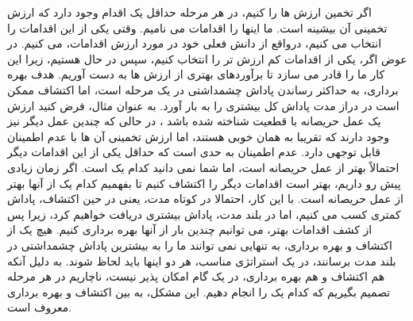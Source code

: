 اگر تخمین ارزش ها را کنیم، در هر مرحله حداقل یک اقدام وجود دارد
که ارزش تخمینی آن بیشینه است. ما اینها را اقدامات  می نامیم. وقتی یکی از این اقدامات را انتخاب می کنیم،
درواقع از دانش فعلی خود در مورد ارزش اقدامات،  می کنیم. در عوض اگر،
یکی از اقدامات کم ارزش تر را انتخاب کنیم، سپس در حال  هستیم، زیرا این کار ما را قادر می سازد تا برآوردهای بهتری از ارزش ها به دست آوریم. هدف بهره برداری، به حداکثر رساندن پاداش چشمداشتی در یک مرحله است، اما اکتشاف ممکن است در دراز مدت پاداش کل بیشتری را به بار آورد.
به عنوان مثال، فرض کنید ارزش یک عمل حریصانه با قطعیت شناخته شده باشد ، در حالی که چندین عمل دیگر نیز وجود دارند که
تقریبا به همان خوبی  هستند، اما ارزش تخمینی آن ها با عدم اطمینان قابل توجهی دارد. عدم اطمینان به حدی است که حداقل
یکی از این اقدامات دیگر احتمالاً بهتر از عمل حریصانه است، اما شما نمی دانید کدام یک است.
اگر زمان زیادی پیش رو داریم، بهتر است
اقدامات دیگر را اکتشاف کنیم تا بفهمیم کدام یک از آنها بهتر از عمل حریصانه است. با این کار، احتمالا در کوتاه مدت، یعنی در حین اکتشاف، پاداش کمتری کسب می کنیم، اما در بلند مدت، پاداش بیشتری دریافت خواهیم کرد، زیرا پس از کشف اقدامات بهتر، می توانیم چندین بار از آنها بهره برداری کنیم. 
هیچ یک از اکتشاف و بهره برداری، به تنهایی نمی توانند ما را به بیشترین پاداش چشمداشتی در بلند مدت برسانند، در یک استراتژی مناسب، هر دو اینها باید لحاظ شوند. به دلیل آنکه هم اکتشاف و هم بهره برداری، در یک گام امکان پذیر نیست، ناچاریم در هر مرحله تصمیم بگیریم که کدام یک را انجام دهیم. این مشکل، به  بین اکتشاف و بهره برداری معروف است.


